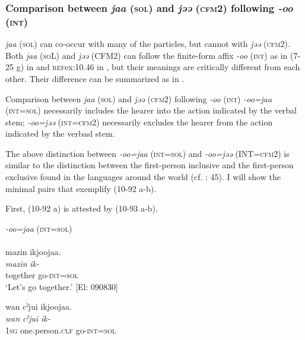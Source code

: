 \subsubsection{Comparison between \textit{jaa} (\textsc{sol}) and \textit{jəə} (\textsc{cfm}2) following \textit{{}-oo} (\textsc{int})}\label{sec:10.5.2.2}

\textit{jaa} (\textsc{sol}) can co-occur with many of the particles, but cannot with \textit{jəə} (\textsc{cfm}2). Both \textit{jaa} (\textsc{so}L) and \textit{jəə} (CFM2) can follow the finite-form affix \textit{-oo} (\textsc{int}) as in (7-25 g) in  and \textsc{ref}{ex:10.46} in , but their meanings are critically different from each other. Their difference can be summarized as in .

\ea\label{ex:10.92}
Comparison between \textit{jaa} (\textsc{sol}) and \textit{jəə} (\textsc{cfm}2) following \textit{{}-oo} (\textsc{int})
  \ea \textit{{}-oo=jaa} (\textsc{int}=\textsc{sol}) necessarily includes the hearer into the action indicated by the verbal stem;
  \ex \textit{{}-oo=jəə} (\textsc{int}=\textsc{cfm}2) necessarily excludes the hearer from the action indicated by the verbasl stem.
  \z
\z

The above distinction between \textit{{}-oo=jaa} (\textsc{int}=\textsc{sol}) and \textit{{}-oo=jəə} (INT=\textsc{cfm}2) is similar to the distinction between the first-person inclusive and the first-person exclusive found in the languages around the world (cf. \citealt{Payne1997}: 45). I will show the minimal pairs that exemplify (10-92 a-b).

First, (10-92 a) is attested by (10-93 a-b).

\ea\label{ex:10.93}   \textit{{}-oo=jaa} (\textsc{int}=\textsc{sol})\\
  \ea{}\\
      \glll     mazin  ikjoojaa.\\
       \textit{mazin}  \textit{ik-}\\
       together  go-\textsc{int}=\textsc{sol}\\
      \glt       ‘Let’s go together.’ [El: 090830]

  \ex  %
      \glll    *wan  cˀjui  ikjoojaa.\\
       \textit{wan}  \textit{cˀjui}  \textit{ik-}\\
       1\textsc{sg}  one.person.\textsc{clf}  go-\textsc{int}=\textsc{sol}\\
       \glt    [El: 090830]
    \z
\z

